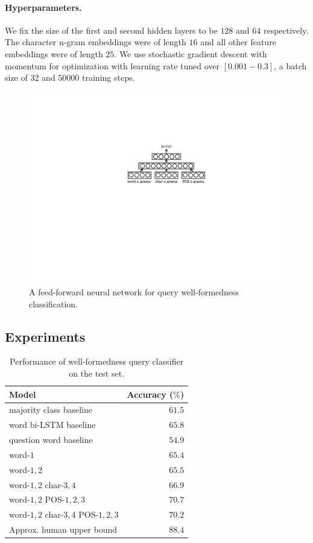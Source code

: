 \documentclass[11pt,a4paper]{article}
\begin{document}
\paragraph{Hyperparameters.} 
We fix the size of the first and second hidden layers to be
$128$ and $64$ respectively. The character n-gram embeddings were of length $16$
and all other  feature embeddings were of length $25$. We use stochastic gradient
descent with momentum  for optimization with learning rate tuned over
$[0.001-0.3]$, a batch size of $32$ and $50000$ training steps.

\begin{figure}[!tb]
    \centering
    \includegraphics[scale=0.5]{diagram.pdf}
    \caption{A feed-forward neural network for query well-formedness classification.}
    \label{fig:model}
\end{figure}

\subsection{Experiments}

\begin{table}[!tb]
  \centering
  \begin{tabular}{|lr|}
  \hline
  Model & Accuracy ($\%$)\\
  \hline
  majority class baseline & $61.5$ \\
  word bi-LSTM baseline & $65.8$ \\
  question word baseline & $54.9$\\
  \hline
  word-$1$ & $65.4$\\
  word-$1,2$ & $65.5$\\
  word-$1,2$ char-$3,4$ & $66.9$\\
  word-$1,2$ POS-$1,2,3$ & $\mathbf{70.7}$\\
  word-$1,2$ char-$3,4$ POS-$1,2,3$ & $70.2$\\
  \hline
  Approx. human upper bound & $88.4$\\
  \hline
  \end{tabular}
  \caption{Performance of well-formedness query classifier on the test set.}
  \label{tab:results}
\end{table}
\end{document}
